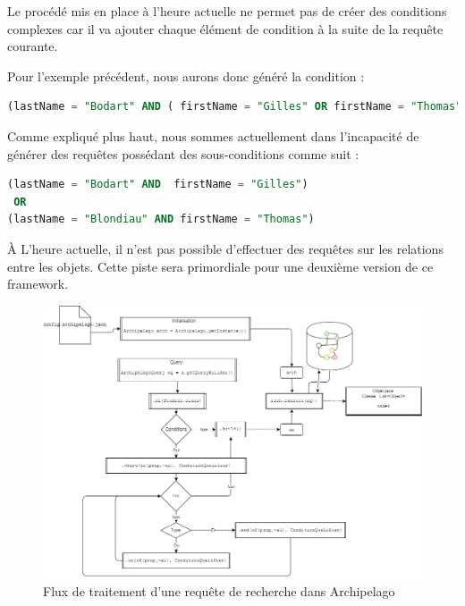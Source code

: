 \documentclass[a4paper,fleqn,12pt,oneside]{report}
\begin{document}
Le procédé mis en place à l'heure actuelle ne permet pas de créer des conditions complexes car il va ajouter chaque élément de condition à la suite de la requête courante. 

Pour l'exemple précédent, nous aurons donc généré la condition : 

\begin{lstlisting}[language=SQL]
(lastName = "Bodart" AND ( firstName = "Gilles" OR firstName = "Thomas"))
\end{lstlisting}

Comme expliqué plus haut, nous sommes actuellement dans l'incapacité de générer des requêtes possédant des sous-conditions comme suit :

\begin{lstlisting}[language=SQL]
(lastName = "Bodart" AND  firstName = "Gilles") 
 OR 
(lastName = "Blondiau" AND firstName = "Thomas")
\end{lstlisting}
\label{badCondition}
\`A L'heure actuelle, il n'est pas possible d'effectuer des requêtes sur les relations entre les objets. Cette piste sera primordiale pour une deuxième version de ce framework.
\newpage

\begin{figure}[!ht]
\centering
\includegraphics[scale=0.5]{figures/query.png}
\caption{Flux de traitement d'une requête de recherche dans Archipelago}
\label{fig:Query}
\end{figure}


\newpage
\end{document}
